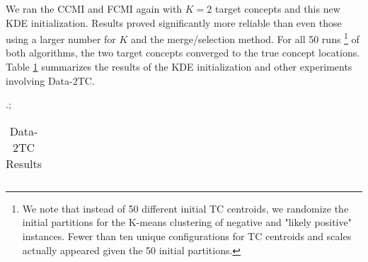\documentclass[12pt,dvips]{report}
\numberwithin{equation}{section}
\begin{document}
We ran the CCMI and FCMI again with $K=2$ target concepts and this new KDE initialization.  Results proved significantly more reliable than even those using a larger number for $K$ and the merge/selection method.  For all 50 runs \footnote{We note that instead of 50 different initial TC centroids, we randomize the initial partitions for the K-means clustering of negative and "likely positive" instances.  Fewer than ten unique configurations for TC centroids and scales actually appeared given the 50 initial partitions.} of both algorithms, the two target concepts converged to the true concept locations.  Table \ref{tab:Data2TC} summarizes the results of the KDE initialization and other experiments involving Data-2TC.



\begin {table}[H]
\caption{Data-2TC Results} \label{tab:Data2TC} .;
\begin{center}
\begin{tabular}{lrrrrrrr}
\hline


\end{tabular}
\end{center}
\end{table}
\end{document}
